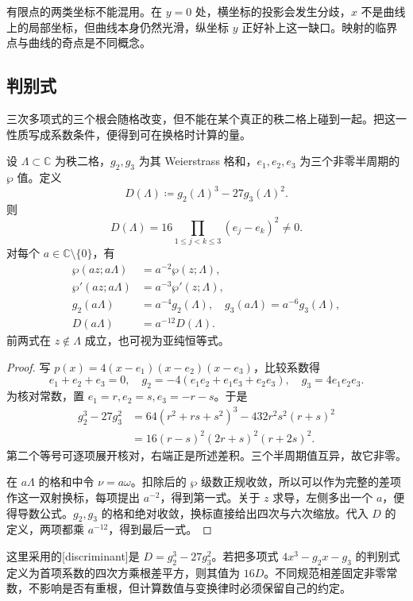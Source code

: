有限点的两类坐标不能混用。在 \(y=0\) 处，横坐标的投影会发生分歧，\(x\) 不是曲线上的局部坐标，但曲线本身仍然光滑，纵坐标 \(y\) 正好补上这一缺口。映射的临界点与曲线的奇点是不同概念。

\subsection{判别式}
\label{b3:subsec:220402}

三次多项式的三个根会随格改变，但不能在某个真正的秩二格上碰到一起。把这一性质写成系数条件，便得到可在换格时计算的量。

\begin{proposition}[判别式与格的缩放]\label{b3:prop:22-discriminant-scaling}
设 \(\Lambda\subset\mathbb C\) 为秩二格，\(g_2,g_3\) 为其 Weierstrass 格和，\(e_1,e_2,e_3\) 为三个非零半周期的 \(\wp\) 值。定义
\[
 D(\Lambda)\coloneqq g_2(\Lambda)^3-27g_3(\Lambda)^2.
\]
则
\[
 D(\Lambda)=16\prod_{1\le j<k\le3}(e_j-e_k)^2\ne0.
\]
对每个 \(a\in\mathbb C\setminus\{0\}\)，有
\begin{equation}\label{b3:eq:22-scaling}
 \begin{aligned}
 \wp(az;a\Lambda)&=a^{-2}\wp(z;\Lambda),\\
 \wp'(az;a\Lambda)&=a^{-3}\wp'(z;\Lambda),\\
 g_2(a\Lambda)&=a^{-4}g_2(\Lambda),\quad
 g_3(a\Lambda)=a^{-6}g_3(\Lambda),\\
 D(a\Lambda)&=a^{-12}D(\Lambda).
 \end{aligned}
\end{equation}
前两式在 \(z\notin\Lambda\) 成立，也可视为亚纯恒等式。
\end{proposition}
\begin{proof}
写 \(p(x)=4(x-e_1)(x-e_2)(x-e_3)\)，比较系数得
\[
 e_1+e_2+e_3=0,\quad
 g_2=-4(e_1e_2+e_1e_3+e_2e_3),\quad
 g_3=4e_1e_2e_3.
\]
为核对常数，置 \(e_1=r,e_2=s,e_3=-r-s\)。于是
\[
 \begin{aligned}
 g_2^3-27g_3^2
 &=64(r^2+rs+s^2)^3-432r^2s^2(r+s)^2\\
 &=16(r-s)^2(2r+s)^2(r+2s)^2.
 \end{aligned}
\]
第二个等号可逐项展开核对，右端正是所述差积。三个半周期值互异，故它非零。

在 \(a\Lambda\) 的格和中令 \(\nu=a\omega\)。扣除后的 \(\wp\) 级数正规收敛，所以可以作为完整的差项作这一双射换标，每项提出 \(a^{-2}\)，得到第一式。关于 \(z\) 求导，左侧多出一个 \(a\)，便得导数公式。\(g_2,g_3\) 的格和绝对收敛，换标直接给出四次与六次缩放。代入 \(D\) 的定义，两项都乘 \(a^{-12}\)，得到最后一式。
\end{proof}
这里采用的[discriminant]是 \(D=g_2^3-27g_3^2\)。若把多项式 \(4x^3-g_2x-g_3\) 的判别式定义为首项系数的四次方乘根差平方，则其值为 \(16D\)。不同规范相差固定非零常数，不影响是否有重根，但计算数值与变换律时必须保留自己的约定。

